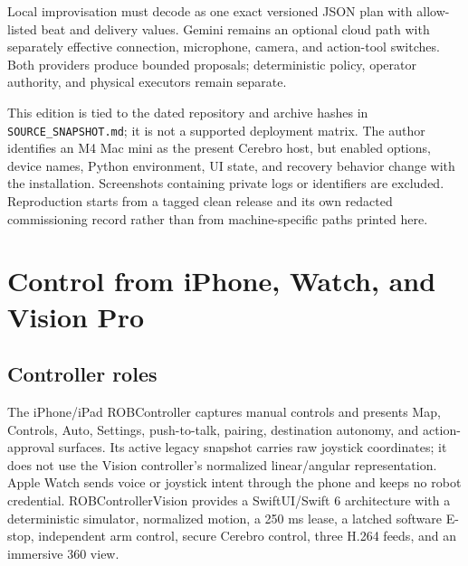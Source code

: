 \documentclass[10pt,openany]{book}
\begin{document}
Local improvisation must decode as one exact versioned JSON plan with allow-listed beat and delivery values. Gemini remains an optional cloud path with separately effective connection, microphone, camera, and action-tool switches. Both providers produce bounded proposals; deterministic policy, operator authority, and physical executors remain separate.

\begin{fieldnotebox}[title={SOFTWARE SNAPSHOT BOUNDARY}]
This edition is tied to the dated repository and archive hashes in \texttt{SOURCE\_SNAPSHOT.md}; it is not a supported deployment matrix. The author identifies an M4 Mac mini as the present Cerebro host, but enabled options, device names, Python environment, UI state, and recovery behavior change with the installation. Screenshots containing private logs or identifiers are excluded. Reproduction starts from a tagged clean release and its own redacted commissioning record rather than from machine-specific paths printed here.
\end{fieldnotebox}


\chapter{Control from iPhone, Watch, and Vision Pro}

\section{Controller roles}

The iPhone/iPad ROBController captures manual controls and presents Map, Controls, Auto, Settings, push-to-talk, pairing, destination autonomy, and action-approval surfaces. Its active legacy snapshot carries raw joystick coordinates; it does not use the Vision controller's normalized linear/angular representation. Apple Watch sends voice or joystick intent through the phone and keeps no robot credential. ROBControllerVision provides a SwiftUI/Swift 6 architecture with a deterministic simulator, normalized motion, a 250 ms lease, a latched software E-stop, independent arm control, secure Cerebro control, three H.264 feeds, and an immersive 360 view.
\end{document}
